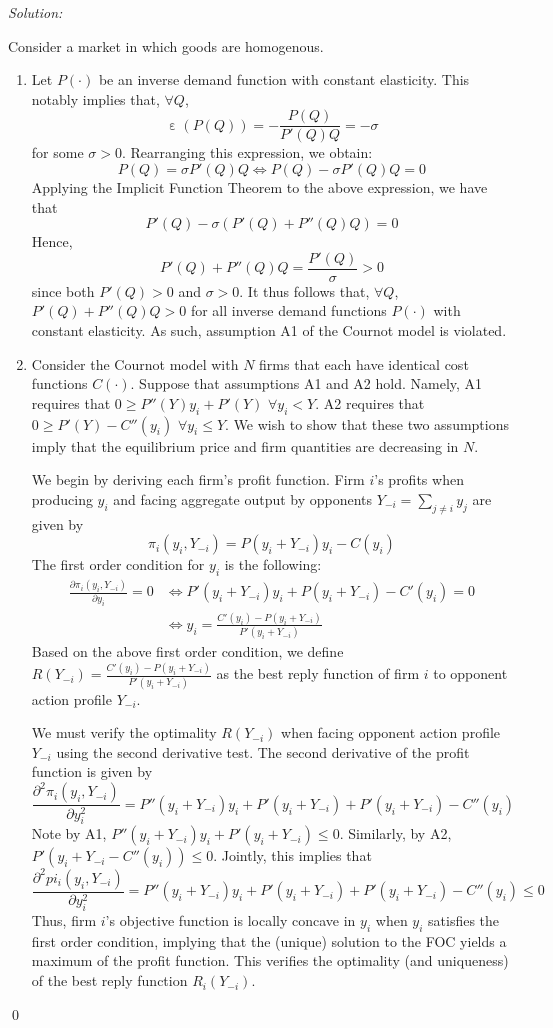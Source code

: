 \documentclass[12pt]{article}
\DeclareMathOperator{\eps}{\varepsilon}
\newenvironment{problem}[2][Problem]{\begin{trivlist}
\item[\hskip \labelsep {\bfseries #1}\hskip \labelsep {\bfseries #2.}]}{\end{trivlist}}
\newenvironment{sol}
    {\emph{Solution:}
    }
    {
    \qed
    }
\begin{document}
\begin{problem}{1}
\end{problem}
\begin{sol}
Consider a market in which goods are homogenous. 
\begin{enumerate}[label=\alph*)]
    \item Let $P(\cdot)$ be an inverse demand function with constant elasticity. This notably implies that, $\forall Q$,
    \[\eps(P(Q)) = -\frac{P(Q)}{P'(Q)Q} = -\sigma\]
    for some $\sigma >0$. Rearranging this expression, we obtain:
    \[P(Q) = \sigma P'(Q)Q \iff P(Q) - \sigma P'(Q)Q = 0\]
    Applying the Implicit Function Theorem to the above expression, we have that
    \[P'(Q) - \sigma(P'(Q) + P''(Q)Q ) = 0\]
    Hence,
    \[P'(Q) + P''(Q) Q = \frac{P'(Q)}{\sigma} > 0\]
    since both $P'(Q) > 0$ and $\sigma > 0$. It thus follows that, $\forall Q$, $P'(Q) + P''(Q) Q > 0$ for all inverse demand functions $P(\cdot)$ with constant elasticity. As such, assumption A1 of the Cournot model is violated.
    \item Consider the Cournot model with $N$ firms that each have identical cost functions $C(\cdot)$. Suppose that assumptions A1 and A2 hold. Namely, A1 requires that $0 \geq P''(Y)y_i + P'(Y)$ $\forall y_i < Y$. A2 requires that $ 0 \geq P'(Y) - C''(y_i)$ $\forall y_i \leq Y$. We wish to show that these two assumptions imply that the equilibrium price and firm quantities are decreasing in $N$.
    
    We begin by deriving each firm's profit function. Firm $i$'s profits when producing $y_i$ and facing aggregate output by opponents $Y_{-i} = \sum_{j \neq i} y_j$ are given by
    \[\pi_i(y_i, Y_{-i}) = P(y_i + Y_{-i}) y_i - C(y_i)\]
    The first order condition for $y_i$ is the following:
    \begin{align*}
        \frac{\partial \pi_i(y_i, Y_{-i})}{\partial y_i} = 0 &\iff P'(y_i + Y_{-i}) y_i + P(y_i + Y_{-i}) - C'(y_i) = 0\\
        &\iff y_i = \frac{C'(y_i) - P(y_i + Y_{-i})}{P'(y_i + Y_{-i})}
    \end{align*}
    Based on the above first order condition, we define $R(Y_{-i}) = \frac{C'(y_i) - P(y_i + Y_{-i})}{P'(y_i + Y_{-i})}$ as the best reply function of firm $i$ to opponent action profile $Y_{-i}$. 
    
    We must verify the optimality $R(Y_{-i})$ when facing opponent action profile $Y_{-i}$ using the second derivative test. The second derivative of the profit function is given by
    \[\frac{\partial^2 \pi_i(y_i, Y_{-i})}{\partial y_i^2} = P''(y_i + Y_{-i}) y_i + P'(y_i + Y_{-i}) + P'(y_i + Y_{-i}) - C''(y_i)\] 
    Note by A1, $P''(y_i + Y_{-i})y_i + P'(y_i + Y_{-i}) \leq 0$. Similarly, by A2, $P'(y_i + Y_{-i} - C''(y_i)) \leq 0$. Jointly, this implies that
    \[\frac{\partial^2 pi_i(y_i, Y_{-i})}{\partial y_i^2} = P''(y_i + Y_{-i}) y_i + P'(y_i + Y_{-i}) + P'(y_i + Y_{-i}) - C''(y_i) \leq 0\]
    Thus, firm $i$'s objective function is locally concave in $y_i$ when $y_i$ satisfies the first order condition, implying that the (unique) solution to the FOC yields a maximum of the profit function. This verifies the optimality (and uniqueness) of the best reply function $R_i(Y_{-i})$.


\end{enumerate}
\end{sol}
\end{document}
